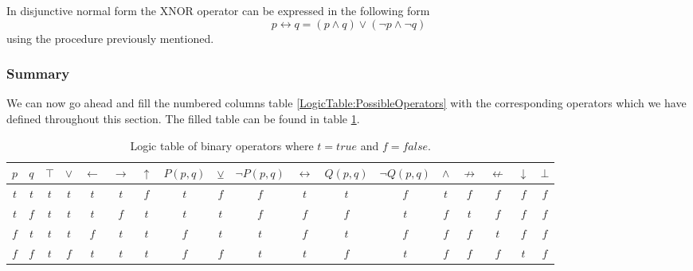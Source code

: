                 In disjunctive normal form the XNOR operator can be expressed in the following form
                \begin{equation}
                    p \leftrightarrow q = (p \wedge  q) \vee (\neg p \wedge \neg q)
                \end{equation}
                using the procedure previously mentioned.
                
            
                
            \subsubsection{Summary}
                We can now go ahead and fill the numbered columns table \ref{LogicTable:PossibleOperators} with the corresponding operators which we have defined throughout this section. The filled table can be found in table \ref{LogicTable:BinaryOperators}. 
                
                \begin{table}[h!]
                    \centering
                    \begin{tabular}{|c|c||c|c|c|c|c|c|c|c|c|c|c|c|c|c|c|c|}
                    	\hline
                    	$p$ & $q$ & $\top$ & $\vee$ & $\leftarrow$ & $\rightarrow$ & $\uparrow$ & $P(p,q)$ & $\veebar$ & $\neg P(p,q)$ & $\leftrightarrow$ & $Q(p, q)$ & $\neg Q(p,q)$ & $\wedge$ & $\not\rightarrow$ & $\not\leftarrow$ & $\downarrow$ & $\bot$ \\ \hline
                    	$t$ & $t$ &  $t$   &  $t$   &     $t$      &      $t$      &    $f$     &   $t$    &    $f$    &      $f$      &        $t$        &    $t$    &      $f$      &   $t$    &        $f$        &       $f$        &     $f$      &  $f$   \\ \hline
                    	$t$ & $f$ &  $t$   &  $t$   &     $t$      &      $f$      &    $t$     &   $t$    &    $t$    &      $f$      &        $f$        &    $f$    &      $t$      &   $f$    &        $t$        &       $f$        &     $f$      &  $f$   \\ \hline
                    	$f$ & $t$ &  $t$   &  $t$   &     $f$      &      $t$      &    $t$     &   $f$    &    $t$    &      $t$      &        $f$        &    $t$    &      $f$      &   $f$    &        $f$        &       $t$        &     $f$      &  $f$   \\ \hline
                    	$f$ & $f$ &  $t$   &  $f$   &     $t$      &      $t$      &    $t$     &   $f$    &    $f$    &      $t$      &        $t$        &    $f$    &      $t$      &   $f$    &        $f$        &       $f$        &     $t$      &  $f$   \\ \hline
                    \end{tabular} 
                    \caption{Logic table of binary operators where $t=true$ and $f=false$.} 
                    \label{LogicTable:BinaryOperators}
                \end{table}
        
